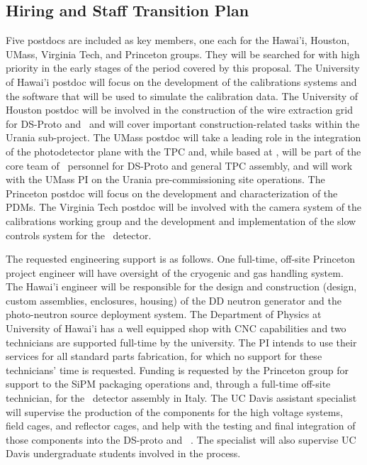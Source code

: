 \subsection{Hiring and Staff Transition Plan}

Five postdocs are included as key members, one each for the Hawai'i, Houston, UMass, Virginia Tech, and Princeton groups. They will be searched for with high priority in the early stages of the period covered by this proposal.  The University of Hawai'i postdoc will focus on the development of the calibrations systems and the software that will be used to simulate the calibration data. The University of Houston postdoc will be involved in the construction of the wire extraction grid for DS-Proto and \DSks\ and will cover important construction-related tasks within the Urania sub-project.  The UMass postdoc will take a leading role in the integration of the photodetector plane with the TPC and, while based at \CERN, will be part of the core team of \DS\ personnel for DS-Proto and general TPC assembly, and will work with the UMass PI on the Urania pre-commissioning site operations.  The Princeton postdoc will focus on the development and characterization of the PDMs.  The Virginia Tech postdoc will be involved with the camera system of the calibrations working group and the development and implementation of the slow controls system for the \DSks\ detector.  

The requested engineering support is as follows.  One full-time, off-site Princeton project engineer will have oversight of the cryogenic and gas handling system.  The Hawai'i engineer will be responsible for the design and construction (design, custom assemblies, enclosures, housing) of the DD neutron generator and the photo-neutron source deployment system.  The Department of Physics at University of Hawai'i has a well equipped shop with CNC capabilities and two technicians are supported full-time by the university.  The PI intends to use their services for all standard parts fabrication, for which no support for these technicians' time is requested. Funding is requested by the Princeton group for support to the SiPM packaging operations and, through a full-time off-site technician, for the \SiPM\ detector assembly in Italy.  The UC Davis assistant specialist will supervise the production of the components for the high voltage systems, field cages, and reflector cages, and help with the testing and final integration of those components into the DS-proto and \DSks\ \TPC.  The specialist will also supervise UC Davis undergraduate students involved in the process.